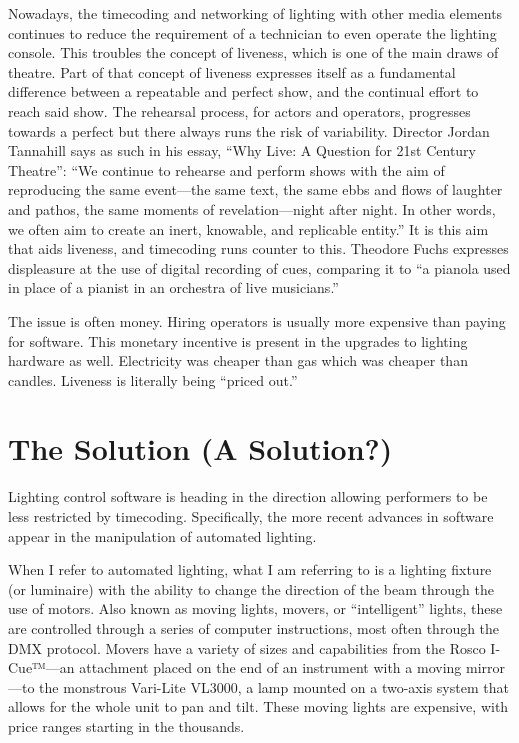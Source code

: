 \documentclass[
    12pt,
    twoside,
    bibstyle=chicago,
    headerstyle=uppercase,
	bibfile=biblatex_updating.bib
]{reedthesis}
\begin{document}
Nowadays, the timecoding and networking of lighting with other media elements continues to reduce the requirement of a technician to even operate the lighting console. This troubles the concept of liveness, which is one of the main draws of theatre. Part of that concept of liveness expresses itself as a fundamental difference between a repeatable and perfect show, and the continual effort to reach said show. The rehearsal process, for actors and operators, progresses towards a perfect but there always runs the risk of variability. Director Jordan Tannahill says as such in his essay, “Why Live: A Question for 21st Century Theatre”: “We continue to rehearse and perform shows with the aim of reproducing the same event---the same text, the same ebbs and flows of laughter and pathos, the same moments of revelation---night after night. In other words, we often aim to create an inert, knowable, and replicable entity.” %
It is this aim that aids liveness, and timecoding runs counter to this. Theodore Fuchs expresses displeasure at the use of digital recording of cues, comparing it to “a pianola used in place of a pianist in an orchestra of live musicians.” 

The issue is often money. Hiring operators is usually more expensive than paying for software. This monetary incentive is present in the upgrades to lighting hardware as well. Electricity was cheaper than gas which was cheaper than candles. Liveness is literally being “priced out.”

\section{The Solution (A Solution?)}
Lighting control software is heading in the direction allowing performers to be less restricted by timecoding. Specifically, the more recent advances in software appear in the manipulation of automated lighting. 

When I refer to automated lighting, what I am referring to is a lighting fixture (or luminaire) with the ability to change the direction of the beam through the use of motors. Also known as moving lights, movers, or “intelligent” lights, these are controlled through a series of computer instructions, most often through the DMX protocol. Movers have a variety of sizes and capabilities from the Rosco I-Cue™---an attachment placed on the end of an instrument with a moving mirror---to the monstrous Vari-Lite VL3000, a lamp mounted on a two-axis system that allows for the whole unit to pan and tilt. These moving lights are expensive, with price ranges starting in the thousands.
\end{document}
